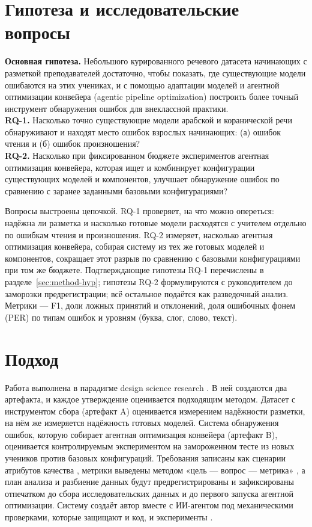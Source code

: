 \section{Гипотеза и исследовательские вопросы}\label{sec:rq}

\begin{rqbox}
\textbf{Основная гипотеза.} Небольшого курированного речевого датасета начинающих с разметкой преподавателей достаточно, чтобы показать, где существующие модели ошибаются на этих учениках, и с помощью адаптации моделей и агентной оптимизации конвейера (agentic pipeline optimization) построить более точный инструмент обнаружения ошибок для внеклассной практики.\\[6pt]
\textbf{RQ-1.} Насколько точно существующие модели арабской и коранической речи обнаруживают и находят место ошибок взрослых начинающих: (а) ошибок чтения и (б) ошибок произношения?\\[4pt]
\textbf{RQ-2.} Насколько при фиксированном бюджете экспериментов агентная оптимизация конвейера, которая ищет и комбинирует конфигурации существующих моделей и компонентов, улучшает обнаружение ошибок по сравнению с заранее заданными базовыми конфигурациями?
\end{rqbox}

Вопросы выстроены цепочкой. RQ-1 проверяет, на что можно опереться: надёжна ли разметка и насколько готовые
модели расходятся с учителем отдельно по ошибкам чтения и произношения. RQ-2 измеряет, насколько агентная
оптимизация конвейера, собирая систему из тех же готовых моделей и компонентов, сокращает этот разрыв по
сравнению с базовыми конфигурациями при том же бюджете. Подтверждающие гипотезы RQ-1 перечислены в
разделе~\ref{sec:method-hyp}; гипотезы RQ-2 формулируются с руководителем до заморозки предрегистрации; всё
остальное подаётся как разведочный анализ. Метрики --- F1, доли ложных принятий и отклонений, доля ошибочных
фонем (PER) по типам ошибок и уровням (буква, слог, слово, текст).

\section{Подход}

Работа выполнена в парадигме design science research \cite{SRC-100,SRC-101}. В ней создаются два артефакта,
и каждое утверждение оценивается подходящим методом. Датасет с инструментом сбора (артефакт A) оценивается
измерением надёжности разметки, на нём же измеряется надёжность готовых моделей. Система обнаружения ошибок,
которую собирает агентная оптимизация конвейера (артефакт B), оценивается контролируемым экспериментом на
замороженном тесте из новых учеников против базовых конфигураций. Требования записаны как сценарии атрибутов качества \cite{SRC-047}, метрики выведены методом
«цель --- вопрос --- метрика» \cite{SRC-048}, а план анализа и разбиение данных будут предрегистрированы и
зафиксированы отпечатком до сбора исследовательских данных и до первого запуска агентной оптимизации. Систему создаёт
автор вместе с ИИ-агентом под механическими проверками, которые защищают и код, и эксперименты \cite{SRC-067}.

